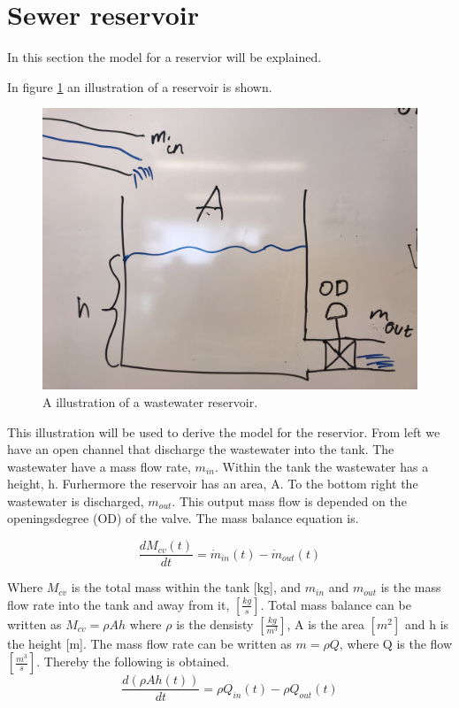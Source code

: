 \section{Sewer reservoir}\label{se:sewer_reservoir}
In this section the model for a reservior will be explained. 

In figure \ref{fig:tank_model} an illustration of a reservoir is shown.
\begin{figure}[H]
\centering
\includegraphics[width=.6\textwidth]{report/modeling/pictures/tank_model.jpg}
\caption{A illustration of a wastewater reservoir.}
\label{fig:tank_model}
\end{figure} 

This illustration will be used to derive the model for the reservior. From left we have an open channel that discharge the wastewater into the tank. The wastewater have a mass flow rate, $m_{in}$. Within the tank the wastewater has a height, h. Furhermore the reservoir has an area, A. To the bottom right the wastewater is discharged, $m_{out}$. This output mass flow is depended on the openingsdegree (OD) of the valve. The mass balance equation is.


\begin{equation}
	 	\frac{dM_{cv}(t)}{dt}=\dot{m}_{in}(t)-\dot{m}_{out}(t)
\end{equation} 

Where $M_{cv}$ is the total mass within the tank [kg], and $m_{in}$ and $m_{out}$ is the mass flow rate into the tank and away from it, $\left[\frac{kg}{s}\right]$. Total mass balance can be written as $M_{cv} = \rho Ah$ where $\rho$ is the densisty $\left[\frac{kg}{m^3}\right]$, A is the area $\left[m^2\right]$ and h is the height [m]. The mass flow rate can be written as $m = \rho Q$, where Q is the flow $\left[\frac{m^3}{s}\right]$. Thereby the following is obtained.
\begin{equation}
		\frac{d(\rho Ah(t))}{dt}=\rho Q_{in}(t)-\rho Q_{out}(t)
\end{equation}


